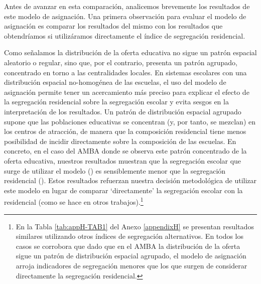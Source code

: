 \documentclass[
  spanish,
  a4paper,%
  chapterprefix=true,%
  DIV=calc,%
  twoside]{scrbook}%
\begin{document}
Antes de avanzar en esta comparación, analicemos brevemente los
resultados de este modelo de asignación. Una primera observación para
evaluar el modelo de asignación es comparar los resultados del mismo con
los resultados que obtendríamos si utilizáramos directamente el índice
de segregación residencial.

Como señalamos la distribución de la oferta educativa no sigue un patrón
espacial aleatorio o regular, sino que, por el contrario, presenta un
patrón agrupado, concentrado en torno a las centralidades locales. En
sistemas escolares con una distribución espacial no-homogénea de las
escuelas, el uso del modelo de asignación permite tener un acercamiento
más preciso para explicar el efecto de la segregación residencial sobre
la segregación escolar y evita sesgos en la interpretación de los
resultados. Un patrón de distribución espacial agrupado supone que las
poblaciones educativas se concentran (y, por tanto, se mezclan) en los
centros de atracción, de manera que la composición residencial tiene
menos posibilidad de incidir directamente sobre la composición de las
escuelas. En concreto, en el caso del AMBA donde se observa este patrón
concentrado de la oferta educativa, nuestros resultados muestran que la
segregación escolar que surge de utilizar el modelo
() es sensiblemente menor que
la segregación residencial (). Estos
resultados refuerzan nuestra decisión metodológica de utilizar este
modelo en lugar de comparar `directamente' la segregación escolar con la
residencial (como se hace en otros trabajos).\footnote{En la Tabla \ref{tab:appH-TAB1} del Anexo
  \ref{appendixH} se presentan resultados similares utilizando otros
  índices de segregación alternativos. En todos los casos se corrobora
  que dado que en el AMBA la distribución de la oferta sigue un patrón
  de distribución espacial agrupado, el modelo de asignación arroja
  indicadores de segregación menores que los que surgen de considerar
  directamente la segregación residencial.}
\end{document}
